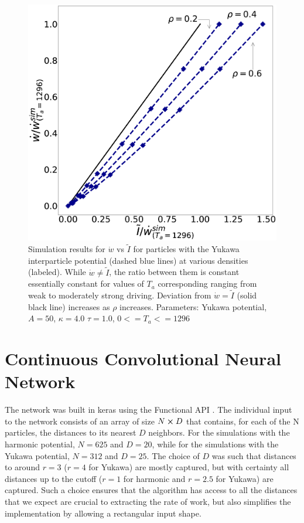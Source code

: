 \documentclass[superscriptaddress, amsmath,preprintnumbers,10pt,article,notitlepage]{revtex4-1}
\begin{document}
\begin{figure}
    \centering
    \includegraphics[scale=0.15, clip=True]{Yukawa_Figure.eps}
    \caption{Simulation results for $\dot{w}$ vs $\tilde I$ for particles with the Yukawa interparticle potential (dashed blue lines) at various densities (labeled). While $\dot{w} \neq \tilde I$, the ratio between them is constant essentially constant for values of $T_a$ corresponding ranging from weak to moderately strong driving. Deviation from $\dot{w} = \tilde I$ (solid black line) increases as $\rho$ increases. Parameters: Yukawa potential, $A=50$, $\kappa=4.0$ $\tau=1.0$, $0<=T_a<=1296$}
    \label{Fig:S1}
\end{figure}

\section{Continuous Convolutional Neural Network}

The network was built in keras using the Functional API \cite{keras}. The individual input to the network consists of an array of size $N \cross D$ that contains, for each of the N particles, the distances to its nearest $D$ neighbors. For the simulations with the harmonic potential, $N = 625$ and $D = 20$, while for the simulations with the Yukawa potential, $N = 312$ and $D = 25$. The choice of $D$ was such that distances to around $r = 3$ ($r = 4$ for Yukawa) are mostly captured, but with certainty all distances up to the cutoff ($r = 1$ for harmonic and $r=2.5$ for Yukawa) are captured. Such a choice ensures that the algorithm has access to all the distances that we expect are crucial to extracting the rate of work, but also simplifies the implementation by allowing a rectangular input shape.
\end{document}

